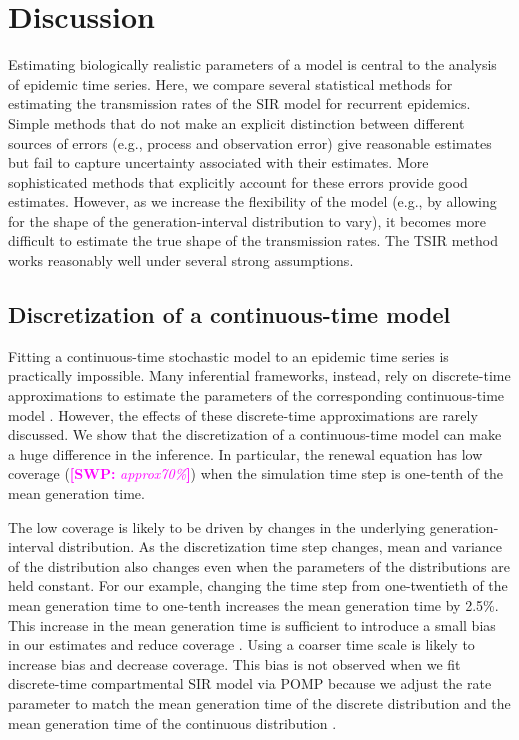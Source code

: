 \documentclass{article}
\newcommand{\comment}[3]{\textcolor{#1}{\textbf{[#2: }\textsl{#3}\textbf{]}}}
\newcommand{\swp}[1]{\comment{magenta}{SWP}{#1}}
\begin{document}
\section{Discussion}

Estimating biologically realistic parameters of a model is central to the analysis of epidemic time series.
Here, we compare several statistical methods for estimating the transmission rates of the SIR model for recurrent epidemics.
Simple methods that do not make an explicit distinction between different sources of errors (e.g., process and observation error) give reasonable estimates but fail to capture uncertainty associated with their estimates.
More sophisticated methods that explicitly account for these errors provide good estimates.
However, as we increase the flexibility of the model (e.g., by allowing for the shape of the generation-interval distribution to vary), it becomes more difficult to estimate the true shape of the transmission rates.
The TSIR method works reasonably well under several strong assumptions.

\subsection{Discretization of a continuous-time model}

Fitting a continuous-time stochastic model to an epidemic time series is practically impossible.
Many inferential frameworks, instead, rely on discrete-time approximations to estimate the parameters of the corresponding continuous-time model \citep{finkenstadt2002stochastic, king2015statistical, champredon2018two, li2018fitting}.
However, the effects of these discrete-time approximations are rarely discussed.
We show that the discretization of a continuous-time model can make a huge difference in the inference.
In particular, the renewal equation has low coverage (\swp{approx70\%}) when the simulation time step is one-tenth of the mean generation time.

The low coverage is likely to be driven by changes in the underlying generation-interval distribution.
As the discretization time step changes, mean and variance of the distribution also changes even when the parameters of the distributions are held constant.
For our example, changing the time step from one-twentieth of the mean generation time to one-tenth increases the mean generation time by 2.5\%.
This increase in the mean generation time is sufficient to introduce a small bias in our estimates and reduce coverage \citep{wallinga2006generation}.
Using a coarser time scale is likely to increase bias and decrease coverage.
This bias is not observed when we fit discrete-time compartmental SIR model via POMP because we adjust the rate parameter to match the mean generation time of the discrete distribution and the mean generation time of the continuous distribution \citep{he2009plug}.
\end{document}
